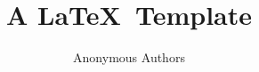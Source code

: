 \documentclass[sigconf]{acmart}
\begin{document}
\title{A \LaTeX\ Template}


\author{Anonymous Authors}

\renewcommand{\shortauthors}{R. Gibb .et al.}

\begin{abstract}
    \blindtext
\end{abstract}

\maketitle





\end{document}
